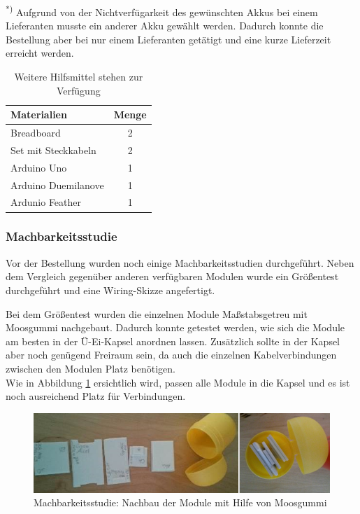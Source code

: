 {\textsuperscript{*)} Aufgrund von der Nichtverfügarkeit des gewünschten Akkus bei einem Lieferanten musste ein anderer Akku gewählt werden. Dadurch konnte die Bestellung aber bei nur einem Lieferanten getätigt und eine kurze Lieferzeit erreicht werden.

\begin{table}[h]
	\centering
	\begin{tabular}{|l|c|}
		\hline
		\textbf{Materialien} & \textbf{Menge} \\
		\hline
		Breadboard & 2 \\
		\hline
		Set mit Steckkabeln & 2 \\
		\hline
		Arduino Uno & 1 \\
		\hline	
		Arduino Duemilanove & 1 \\
		\hline	
		Ardunio Feather & 1\\
		\hline
	\end{tabular}
	\caption{Weitere Hilfsmittel stehen zur Verfügung}
	\label{tab:verfuegbareHW}
\end{table}



\subsubsection{Machbarkeitsstudie}

Vor der Bestellung wurden noch einige Machbarkeitsstudien durchgeführt. Neben dem Vergleich gegenüber anderen verfügbaren Modulen wurde ein Größentest durchgeführt und eine Wiring-Skizze angefertigt.

Bei dem Größentest wurden die einzelnen Module Maßstabsgetreu mit Moosgummi nachgebaut. Dadurch konnte getestet werden, wie sich die Module am besten in der Ü-Ei-Kapsel anordnen lassen. Zusätzlich sollte in der Kapsel aber noch genügend Freiraum sein, da auch die einzelnen Kabelverbindungen zwischen den Modulen Platz benötigen.  \\
Wie in Abbildung \ref{fig:k3_machbarkeitsstudie} ersichtlich wird, passen alle Module in die Kapsel und es ist noch ausreichend Platz für Verbindungen.

\begin{figure}[ht]
	\centering
	\includegraphics[width=1\textwidth]{images/k3-machbarkeitsstudie.PNG}
	\caption {Machbarkeitsstudie: Nachbau der Module mit Hilfe von Moosgummi}
	\label{fig:k3_machbarkeitsstudie}
\end{figure}

}
